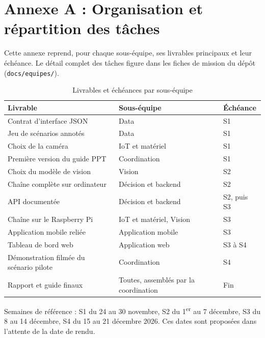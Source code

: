 \chapter*{\textcolor{mycolor}{Annexe A : Organisation et répartition des tâches}}

Cette annexe reprend, pour chaque sous-équipe, ses livrables principaux et leur échéance. Le détail complet des
tâches figure dans les fiches de mission du dépôt (\texttt{docs/equipes/}).

\begin{table}[H]
  \centering
  \small
  \begin{tabularx}{\linewidth}{Xp{4.6cm}p{2cm}}
    \toprule
    Livrable & Sous-équipe & Échéance \\
    \midrule
    Contrat d'interface JSON & Data & S1 \\
    Jeu de scénarios annotés & Data & S1 \\
    Choix de la caméra & IoT et matériel & S1 \\
    Première version du guide PPT & Coordination & S1 \\
    Choix du modèle de vision & Vision & S2 \\
    Chaîne complète sur ordinateur & Décision et backend & S2 \\
    API documentée & Décision et backend & S2, puis S3 \\
    Chaîne sur le Raspberry Pi & IoT et matériel, Vision & S3 \\
    Application mobile reliée & Application mobile & S3 \\
    Tableau de bord web & Application web & S3 à S4 \\
    Démonstration filmée du scénario pilote & Coordination & S4 \\
    Rapport et guide finaux & Toutes, assemblés par la coordination & Fin \\
    \bottomrule
  \end{tabularx}
  \caption{Livrables et échéances par sous-équipe}
  \label{tab:livrables}
\end{table}

\noindent Semaines de référence : S1 du 24 au 30 novembre, S2 du 1\textsuperscript{er} au 7 décembre, S3 du 8 au
14 décembre, S4 du 15 au 21 décembre 2026. Ces dates sont proposées dans l'attente de la date de rendu.
